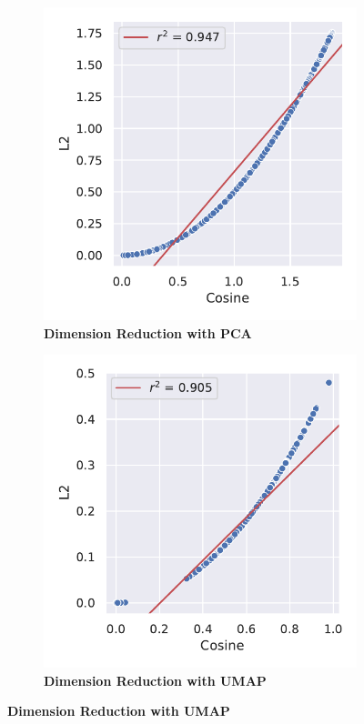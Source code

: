 \begin{figure}
    \centering
    \begin{subfigure}[b]{0.475\textwidth}
        \caption[Dimension Reduction with \Acrshort{PCA}]{\textbf{Dimension Reduction with \Acrshort{PCA}}}
        \label{subfig:Normalisation_PCA}            \includegraphics[width=\textwidth]{PCA/Difference_Distance_Calculation.pdf}
    \end{subfigure}
    \hfill
    \begin{subfigure}[b]{0.475\textwidth}
        \caption[Dimension Reduction with \Acrshort{UMAP}]{\textbf{Dimension Reduction with \Acrshort{UMAP}}}
        \label{subfig:Normalisation_UMAP}            \includegraphics[width=\textwidth]{UMAP/Difference_Distance_Calculation.pdf}

\end{subfigure}
\end{figure}
